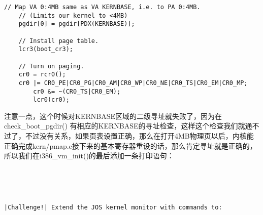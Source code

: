 \documentclass{article}
\newcommand{\funcname}[1]{{\ttfamily \small #1}}
\begin{document}
\begin{CJK*}{UTF8}{gkai}
\begin{lstlisting}[style=ccode, title={\scriptsize \ttfamily \bfseries kern/pmap.c: i386\_vm\_init ()}]
	// Map VA 0:4MB same as VA KERNBASE, i.e. to PA 0:4MB.
	// (Limits our kernel to <4MB)
	pgdir[0] = pgdir[PDX(KERNBASE)];

	// Install page table.
	lcr3(boot_cr3);

	// Turn on paging.
	cr0 = rcr0();
	cr0 |= CR0_PE|CR0_PG|CR0_AM|CR0_WP|CR0_NE|CR0_TS|CR0_EM|CR0_MP;
        cr0 &= ~(CR0_TS|CR0_EM);
        lcr0(cr0);
\end{lstlisting}

注意一点，这个时候对KERNBASE区域的二级寻址就失败了，因为在\funcname{check\_boot\_pgdir()} 有相应的KERNBASE的寻址检查，这样这个检查我们就通不过了，不过没有关系，如果页表设置正确，那么在打开4MB物理页以后，内核能正确完成kern/pmap.c接下来的基本寄存器重设的话，那么肯定寻址就是正确的，所以我们在\funcname{i386\_vm\_init()}的最后添加一条打印语句：

\begin{lstlisting}[style=ccode, title={\scriptsize \ttfamily \bfseries kern/pmap.c: i386\_vm\_init ()}]

\end{lstlisting}

\begin{lstlisting}[style=ccode, title={\scriptsize \ttfamily \bfseries kern/pmap.c: i386\_vm\_init ()}]

\end{lstlisting}

\begin{lstlisting}[style=ccode, title={\scriptsize \ttfamily \bfseries kern/pmap.c: i386\_vm\_init ()}]

\end{lstlisting}

\begin{lstlisting}[style=ccode, title={\scriptsize \ttfamily \bfseries kern/pmap.c: i386\_vm\_init ()}]

\end{lstlisting}

\begin{lstlisting}[style=ccode, title={\scriptsize \ttfamily \bfseries kern/pmap.c: i386\_vm\_init ()}]

\end{lstlisting}



\vspace{4em}


\begin{lstlisting}[style=challenge]
|Challenge!| Extend the JOS kernel monitor with commands to:


\end{lstlisting}
\end{CJK*}
\end{document}
